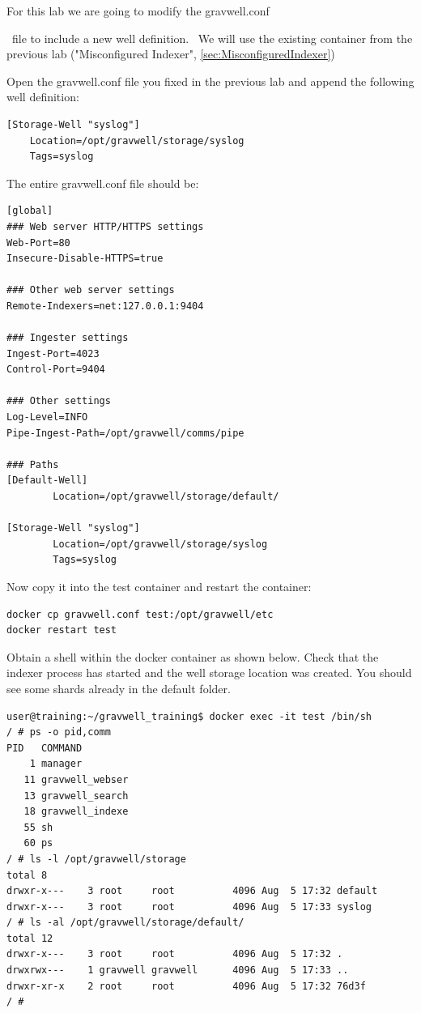 {For this lab we are going to modify the }{gravwell.conf}{~file to
include a new well definition. ~We will use the existing container from
the previous lab ("Misconfigured Indexer", \ref{sec:MisconfiguredIndexer})

Open the gravwell.conf file you fixed in the previous lab and append the
following well definition:

\begin{Verbatim}[breaklines=true]
[Storage-Well "syslog"]
    Location=/opt/gravwell/storage/syslog
    Tags=syslog
\end{Verbatim}


{The entire gravwell.conf file should be:

\begin{Verbatim}[breaklines=true]
[global]
### Web server HTTP/HTTPS settings
Web-Port=80
Insecure-Disable-HTTPS=true

### Other web server settings
Remote-Indexers=net:127.0.0.1:9404

### Ingester settings
Ingest-Port=4023
Control-Port=9404

### Other settings
Log-Level=INFO
Pipe-Ingest-Path=/opt/gravwell/comms/pipe

### Paths
[Default-Well]
        Location=/opt/gravwell/storage/default/

[Storage-Well "syslog"]
        Location=/opt/gravwell/storage/syslog
        Tags=syslog
\end{Verbatim}

Now copy it into the test container and restart the container:

\begin{Verbatim}[breaklines=true]
docker cp gravwell.conf test:/opt/gravwell/etc
docker restart test
\end{Verbatim}

Obtain a shell within the docker container as shown below. Check that the indexer 
process has started and the well storage location was created. You should see some shards already in the default folder.

\begin{Verbatim}[breaklines=true]
user@training:~/gravwell_training$ docker exec -it test /bin/sh
/ # ps -o pid,comm
PID   COMMAND
    1 manager
   11 gravwell_webser
   13 gravwell_search
   18 gravwell_indexe
   55 sh
   60 ps
/ # ls -l /opt/gravwell/storage
total 8
drwxr-x---    3 root     root          4096 Aug  5 17:32 default
drwxr-x---    3 root     root          4096 Aug  5 17:33 syslog
/ # ls -al /opt/gravwell/storage/default/
total 12
drwxr-x---    3 root     root          4096 Aug  5 17:32 .
drwxrwx---    1 gravwell gravwell      4096 Aug  5 17:33 ..
drwxr-xr-x    2 root     root          4096 Aug  5 17:32 76d3f
/ #
\end{Verbatim}

}}
